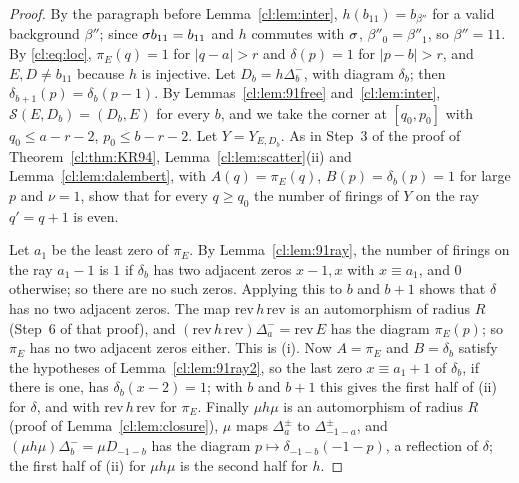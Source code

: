\begin{proof}
By the paragraph before Lemma~\ref{cl:lem:inter}, $h(b_{11})=b_{\beta''}$ for a valid background $\beta''$; since $\sigma b_{11}=b_{11}$ and $h$ commutes with $\sigma$, $\beta''_0=\beta''_1$, so $\beta''=11$. By \eqref{cl:eq:loc}, $\pi_E(q)=1$ for $|q-a|>r$ and $\delta(p)=1$ for $|p-b|>r$, and $E,D\ne b_{11}$ because $h$ is injective. Let $D_b=h\Delta^-_b$, with diagram $\delta_b$; then $\delta_{b+1}(p)=\delta_b(p-1)$. By Lemmas~\ref{cl:lem:91free} and~\ref{cl:lem:inter}, $\mathcal S(E,D_b)=(D_b,E)$ for every $b$, and we take the corner at $[q_0,p_0]$ with $q_0\le a-r-2$, $p_0\le b-r-2$. Let $Y=Y_{E,D_b}$. As in Step~3 of the proof of Theorem~\ref{cl:thm:KR94}, Lemma~\ref{cl:lem:scatter}(ii) and Lemma~\ref{cl:lem:dalembert}, with $A(q)=\pi_E(q)$, $B(p)=\delta_b(p)=1$ for large $p$ and $\nu=1$, show that for every $q\ge q_0$ the number of firings of $Y$ on the ray $q'=q+1$ is even.

Let $a_1$ be the least zero of $\pi_E$. By Lemma~\ref{cl:lem:91ray}, the number of firings on the ray $a_1-1$ is $1$ if $\delta_b$ has two adjacent zeros $x-1,x$ with $x\equiv a_1$, and $0$ otherwise; so there are no such zeros. Applying this to $b$ and $b+1$ shows that $\delta$ has no two adjacent zeros. The map $\mathrm{rev}\,h\,\mathrm{rev}$ is an automorphism of radius $R$ (Step~6 of that proof), and $(\mathrm{rev}\,h\,\mathrm{rev})\Delta^-_a=\mathrm{rev}\,E$ has the diagram $\pi_E(p)$; so $\pi_E$ has no two adjacent zeros either. This is (i). Now $A=\pi_E$ and $B=\delta_b$ satisfy the hypotheses of Lemma~\ref{cl:lem:91ray2}, so the last zero $x\equiv a_1+1$ of $\delta_b$, if there is one, has $\delta_b(x-2)=1$; with $b$ and $b+1$ this gives the first half of (ii) for $\delta$, and with $\mathrm{rev}\,h\,\mathrm{rev}$ for $\pi_E$. Finally $\mu h\mu$ is an automorphism of radius $R$ (proof of Lemma~\ref{cl:lem:closure}), $\mu$ maps $\Delta^\pm_a$ to $\Delta^\pm_{-1-a}$, and $(\mu h\mu)\Delta^-_b=\mu D_{-1-b}$ has the diagram $p\mapsto\delta_{-1-b}(-1-p)$, a reflection of $\delta$; the first half of (ii) for $\mu h\mu$ is the second half for $h$.
\end{proof}

